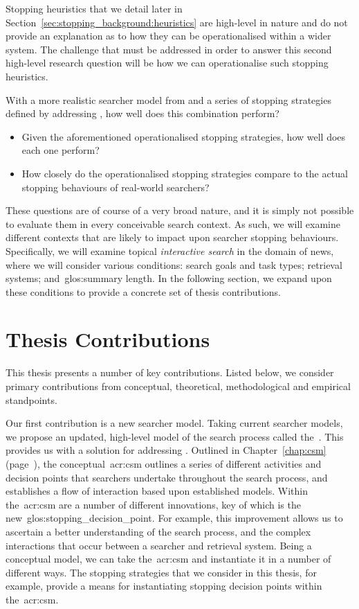 Stopping heuristics that we detail later in Section~\ref{sec:stopping_background:heuristics} are high-level in nature and do not provide an explanation as to how they can be operationalised within a wider system. The challenge that must be addressed in order to answer this second high-level research question will be how we can operationalise such stopping heuristics.

With a more realistic searcher model from  and a series of stopping strategies defined by addressing , how well does this combination perform?

\begin{itemize}
    \item{ Given the aforementioned operationalised stopping strategies, how well does each one perform?}
    \item{ How closely do the operationalised stopping strategies compare to the actual stopping behaviours of real-world searchers?}
\end{itemize}

These questions are of course of a very broad nature, and it is simply not possible to evaluate them in every conceivable search context. As such, we will examine different contexts that are likely to impact upon searcher stopping behaviours. Specifically, we will examine topical \emph{interactive search} in the domain of news, where we will consider various conditions: search goals and task types; retrieval systems; and~\gls{glos:summary} length. In the following section, we expand upon these conditions to provide a concrete set of thesis contributions.

\section{Thesis Contributions}\label{sec:intro:contribs}
This thesis presents a number of key contributions. Listed below, we consider primary contributions from conceptual, theoretical, methodological and empirical standpoints.

\noindent
{} Our first contribution is a new searcher model. Taking current searcher models, we propose an updated, high-level model of the search process called the~. This provides us with a solution for addressing . Outlined in Chapter~\ref{chap:csm} (page~\pageref{chap:csm}), the conceptual~\gls{acr:csm} outlines a series of different activities and decision points that searchers undertake throughout the search process, and establishes a flow of interaction based upon established models. Within the~\gls{acr:csm} are a number of different innovations, key of which is the new~\gls{glos:stopping_decision_point}. For example, this improvement allows us to ascertain a better understanding of the search process, and the complex interactions that occur between a searcher and retrieval system. Being a conceptual model, we can take the~\gls{acr:csm} and instantiate it in a number of different ways. The stopping strategies that we consider in this thesis, for example, provide a means for instantiating stopping decision points within the~\gls{acr:csm}.

